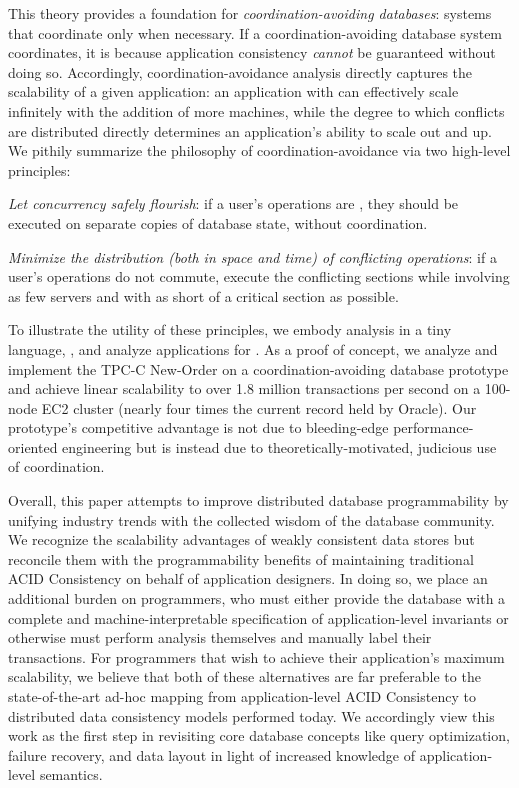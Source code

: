 This theory provides a foundation for \textit{coordination-avoiding
  databases}: systems that coordinate only when necessary.  If a
coordination-avoiding database system coordinates, it is because
application consistency \textit{cannot} be guaranteed without doing
so. Accordingly, coordination-avoidance analysis directly captures the
scalability of a given application: an application with \cfreedom can
effectively scale infinitely with the addition of more machines, while
the degree to which conflicts are distributed directly determines an
application's ability to scale out and up. We pithily summarize the
philosophy of coordination-avoidance via two high-level principles:
\begin{introenumerate}
\item \textit{Let concurrency safely flourish}: if a user's operations
  are \iconfluent, they should be executed on separate copies of
  database state, without coordination.
\item \textit{Minimize the distribution (both in space and time) of
  conflicting operations}: if a user's operations do not commute,
  execute the conflicting sections while involving as few servers and
  with as short of a critical section as possible.
\end{introenumerate}
To illustrate the utility of these principles, we embody \iconfluence
analysis in a tiny language, \lang, and analyze applications for
\cfreedom. As a proof of concept, we analyze and implement the TPC-C
New-Order on a coordination-avoiding database prototype and achieve
linear scalability to over 1.8 million transactions per second on a
100-node EC2 cluster (nearly four times the current record held by
Oracle). Our prototype's competitive advantage is not due to
bleeding-edge performance-oriented engineering but is instead due to
theoretically-motivated, judicious use of coordination.

Overall, this paper attempts to improve distributed database
programmability by unifying industry trends with the collected wisdom
of the database community. We recognize the scalability advantages of
weakly consistent data stores but reconcile them with the
programmability benefits of maintaining traditional ACID Consistency
on behalf of application designers. In doing so, we place an
additional burden on programmers, who must either provide the database
with a complete and machine-interpretable specification of
application-level invariants or otherwise must perform analysis
themselves and manually label their transactions. For programmers that
wish to achieve their application's maximum scalability, we believe
that both of these alternatives are far preferable to the
state-of-the-art ad-hoc mapping from application-level ACID
Consistency to distributed data consistency models performed today. We
accordingly view this work as the first step in revisiting core
database concepts like query optimization, failure recovery, and data
layout in light of increased knowledge of application-level semantics.
